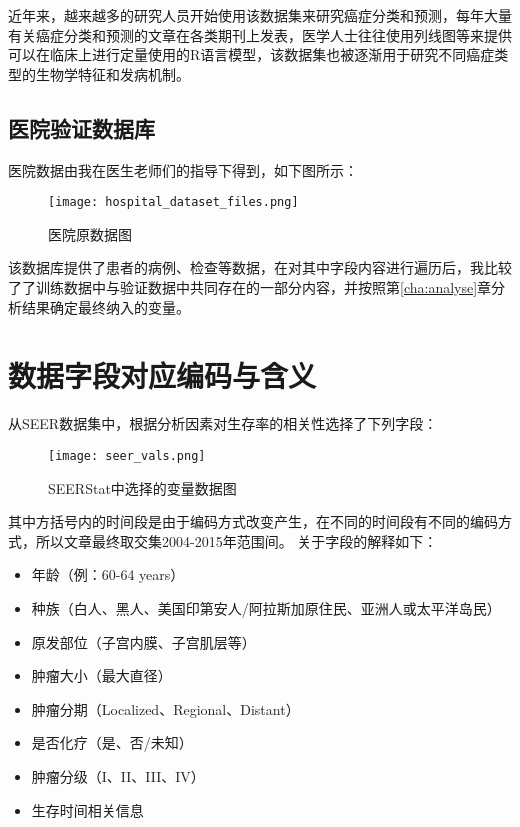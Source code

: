 近年来，越来越多的研究人员开始使用该数据集来研究癌症分类和预测，每年大量有关癌症分类和预测的文章在各类期刊上发表，医学人士往往使用列线图等来提供可以在临床上进行定量使用的R语言模型，该数据集也被逐渐用于研究不同癌症类型的生物学特征和发病机制。

\subsection{医院验证数据库}

医院数据由我在医生老师们的指导下得到，如下图所示：

\begin{figure}[!htbp]
    \centering
    \texttt{[image: hospital\_dataset\_files.png]}
    \caption{医院原数据图} \label{fig:dataset_test_file}
\end{figure}

该数据库提供了患者的病例、检查等数据，在对其中字段内容进行遍历后，我比较了了训练数据中与验证数据中共同存在的一部分内容，并按照第\ref{cha:analyse}章分析结果确定最终纳入的变量。

\section{数据字段对应编码与含义}

从SEER数据集中，根据分析因素对生存率的相关性选择了下列字段：

\begin{figure}[!htbp]
    \centering
    \texttt{[image: seer\_vals.png]}
    \caption{SEERStat中选择的变量数据图} \label{fig:seer_vals}
\end{figure}

其中方括号内的时间段是由于编码方式改变产生，在不同的时间段有不同的编码方式，所以文章最终取交集2004-2015年范围间。
关于字段的解释如下：

\begin{itemize}
  \item 年龄（例：60-64 years）
  \item 种族（白人、黑人、美国印第安人/阿拉斯加原住民、亚洲人或太平洋岛民）
  \item 原发部位（子宫内膜、子宫肌层等）
  \item 肿瘤大小（最大直径）
  \item 肿瘤分期（Localized、Regional、Distant）
  \item 是否化疗（是、否/未知）
  \item 肿瘤分级（I、II、III、IV）
  \item 生存时间相关信息
\end{itemize}

